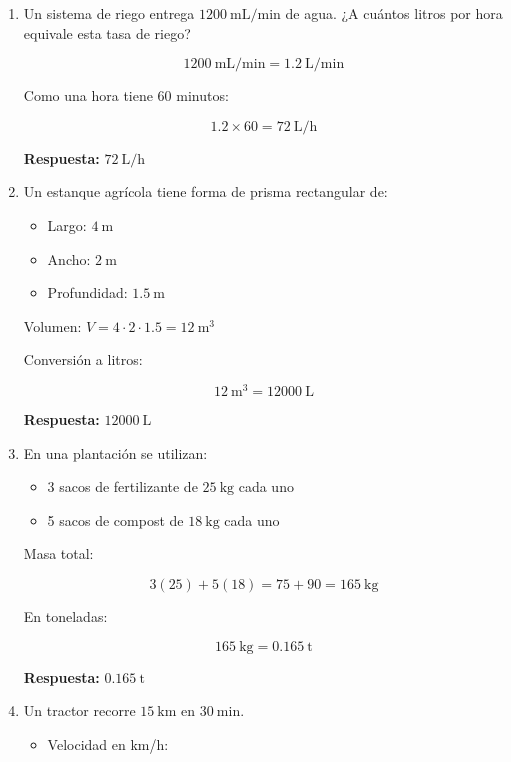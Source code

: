 \documentclass[12pt]{article}
\begin{document}
	\begin{enumerate}[itemsep=0.6cm]
		\item Un sistema de riego entrega $1200\ \text{mL/min}$ de agua.  
		¿A cuántos litros por hora equivale esta tasa de riego?
		
		\[
		1200\ \text{mL/min} = 1.2\ \text{L/min}
		\]
		
		Como una hora tiene $60$ minutos:
		
		\[
		1.2 \times 60 = 72\ \text{L/h}
		\]
		
		\textbf{Respuesta:} $72\ \text{L/h}$
		
		\item Un estanque agrícola tiene forma de prisma rectangular de:
		\begin{itemize}
			\item Largo: $4\ \text{m}$
			\item Ancho: $2\ \text{m}$
			\item Profundidad: $1.5\ \text{m}$
		\end{itemize}
		
		Volumen: $V = 4 \cdot 2 \cdot 1.5 = 12\ \text{m}^3$
		
		Conversión a litros:
		
		\[
		12\ \text{m}^3 = 12000\ \text{L}
		\]
		
		\textbf{Respuesta:} $12000\ \text{L}$
		
		\newpage
		
		\vspace*{1em}		
		
		
		\item En una plantación se utilizan:
		\begin{itemize}
			\item 3 sacos de fertilizante de $25\ \text{kg}$ cada uno
			\item 5 sacos de compost de $18\ \text{kg}$ cada uno
		\end{itemize}
		
		Masa total:
		
		\[
		3(25) + 5(18) = 75 + 90 = 165\ \text{kg}
		\]
		
		En toneladas:
		
		\[
		165\ \text{kg} = 0.165\ \text{t}
		\]
		
		\textbf{Respuesta:} $0.165\ \text{t}$
		
		\item Un tractor recorre $15\ \text{km}$ en $30\ \text{min}$.
		
		\begin{itemize}
			\item Velocidad en km/h:
			

\end{itemize}
\end{enumerate}
\end{document}
